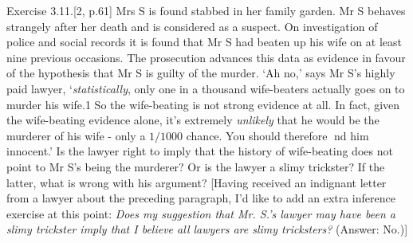 \item
	Exercise 3.11.[2, p.61] Mrs S is found stabbed in her family garden. Mr S
	behaves strangely after her death and is considered as a suspect. On
	investigation of police and social records it is found that Mr S had beaten
	up his wife on at least nine previous occasions. The prosecution advances
	this data as evidence in favour of the hypothesis that Mr S is guilty of the
	murder. `Ah no,' says Mr S's highly paid lawyer, `\textit{statistically}, only one
	in a thousand wife-beaters actually goes on to murder his wife.1 So the
	wife-beating is not strong evidence at all. In fact, given the wife-beating
	evidence alone, it's extremely \textit{unlikely} that he would be the murderer of
	his wife - only a $1/1000$ chance. You should therefore nd him innocent.'
	Is the lawyer right to imply that the history of wife-beating does not
	point to Mr S's being the murderer? Or is the lawyer a slimy trickster?
	If the latter, what is wrong with his argument?
	[Having received an indignant letter from a lawyer about the preceding
	paragraph, I'd like to add an extra inference exercise at this point: \textit{Does
	my suggestion that Mr. S.'s lawyer may have been a slimy trickster imply
	that I believe all lawyers are slimy tricksters?} (Answer: No.)]
